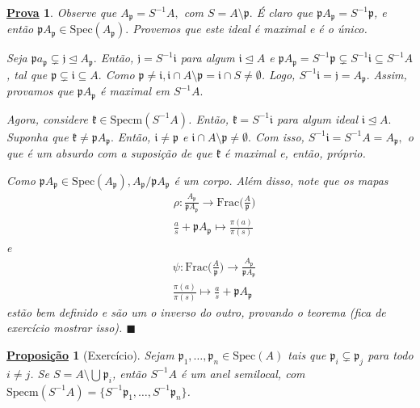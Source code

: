 \documentclass{article}
\newtheorem*{prop*}{\underline{Proposi\c c\~ao}}
\newtheorem*{proof*}{\underline{Prova}}
\renewcommand\qedsymbol{$\blacksquare$}
\begin{document}
\begin{proof*}
  Observe que \(A_{\mathfrak{p}}=S^{-1}A,\) com \(S=A\setminus{\mathfrak{p}}.\) É claro que \(\mathfrak{p}A_{\mathfrak{p}} = S^{-1}\mathfrak{p}\), e então
  \(\mathfrak{p}A_{\mathfrak{p}}\in \mathrm{Spec}(A_{\mathfrak{p}}).\) Provemos que este ideal é maximal e é o único.

  Seja \(\mathfrak{p}a_{\mathfrak{p}}\subsetneq \mathfrak{j}\trianglelefteq{A_{\mathfrak{p}}}. \) Então, \(\mathfrak{j} = S^{-1}\mathfrak{i}\) para algum \(\mathfrak{i}\trianglelefteq{A}\) e 
  \(\mathfrak{p}A_{\mathfrak{p}} = S^{-1}\mathfrak{p}\subsetneq S^{-1}\mathfrak{i}\subseteq S^{-1}A \), tal que \(\mathfrak{p}\subsetneq \mathfrak{i}\subseteq A. \)
  Como \(\mathfrak{p}\neq \mathfrak{i}, \mathfrak{i}\cap A\setminus{\mathfrak{p}} = \mathfrak{i}\cap S \neq\emptyset\). Logo,
  \(S^{-1}\mathfrak{i} = \mathfrak{j} = A_{\mathfrak{p}}.\) Assim, provamos que \(\mathfrak{p}A_{\mathfrak{p}}\) é maximal em \(S^{-1}A.\) 

  Agora, considere \(\mathfrak{k}\in \mathrm{Specm}(S^{-1}A)\). Então, \(\mathfrak{k} = S^{-1}\mathfrak{i}\) para algum ideal 
  \(\mathfrak{i}\trianglelefteq{A}.\) Suponha que \(\mathfrak{k}\neq \mathfrak{p}A_{\mathfrak{p}}.\) Então, \(\mathfrak{i}\neq \mathfrak{p}\) e
  \(\mathfrak{i}\cap A\setminus{\mathfrak{p}}\neq\emptyset.\) Com isso, \(S^{-1}\mathfrak{i} = S^{-1}A = A_{\mathfrak{p}},\) o que é um absurdo com a
  suposição de que \(\mathfrak{k}\) é maximal e, então, próprio.

  Como \(\mathfrak{p}A_{\mathfrak{p}}\in \mathrm{Spec}(A_{\mathfrak{p}}), A_{\mathfrak{p}}/\mathfrak{p}A_{\mathfrak{p}}\) é um corpo. Além disso,
  note que os mapas 
  \begin{align*}
  &\rho :\frac{A_{\mathfrak{p}}}{\mathfrak{p}A_{\mathfrak{p}}}\rightarrow \mathrm{Frac}\biggl(\frac{A}{\mathfrak{p}}\biggr)\\
  &\frac{a}{s} + \mathfrak{p}A_{\mathfrak{p}}\mapsto \frac{\pi (a)}{\pi (s)}
  \end{align*}
  e
  \begin{align*}
  &\psi:\mathrm{Frac}\biggl(\frac{A}{\mathfrak{p}}\biggr)\rightarrow \frac{A_{\mathfrak{p}}}{\mathfrak{p}A_{\mathfrak{p}}}\\
  &\frac{\pi (a)}{\pi (s)}\mapsto \frac{a}{s} + \mathfrak{p}A_{\mathfrak{p}}
  \end{align*}
  estão bem definido e são um o inverso do outro, provando o teorema (fica de exercício mostrar isso). \qedsymbol
\end{proof*}
\begin{prop*}[Exercício]
  Sejam \(\mathfrak{p}_{1}, \dotsc, \mathfrak{p}_{n}\in \mathrm{Spec}(A)\) tais que \(\mathfrak{p}_{i}\subsetneq \mathfrak{p}_{j} \) para todo
  \(i\neq j\). Se \(S = A\setminus{\bigcup_{}^{}\mathfrak{p}_{i}}\), então \(S^{-1}A\) é um anel semilocal, com \(\mathrm{Specm}(S^{-1}A) = \{S^{-1}\mathfrak{p}_{1}, \dotsc, S^{-1}\mathfrak{p}_{n}\}\).
\end{prop*}
\newpage
\end{document}
